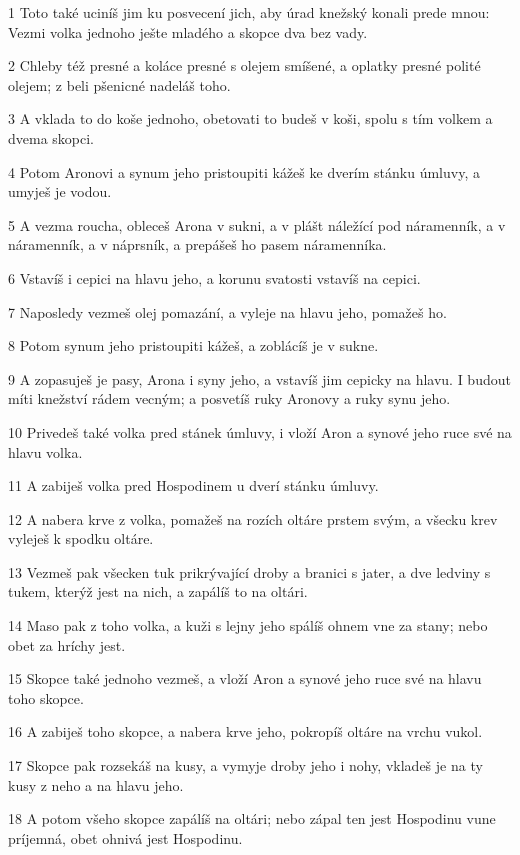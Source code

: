 \par 1 Toto také uciníš jim ku posvecení jich, aby úrad knežský konali prede mnou: Vezmi volka jednoho ješte mladého a skopce dva bez vady.
\par 2 Chleby též presné a koláce presné s olejem smíšené, a oplatky presné polité olejem; z beli pšenicné nadeláš toho.
\par 3 A vklada to do koše jednoho, obetovati to budeš v koši, spolu s tím volkem a dvema skopci.
\par 4 Potom Aronovi a synum jeho pristoupiti kážeš ke dverím stánku úmluvy, a umyješ je vodou.
\par 5 A vezma roucha, obleceš Arona v sukni, a v plášt náležící pod náramenník, a v náramenník, a v náprsník, a prepášeš ho pasem náramenníka.
\par 6 Vstavíš i cepici na hlavu jeho, a korunu svatosti vstavíš na cepici.
\par 7 Naposledy vezmeš olej pomazání, a vyleje na hlavu jeho, pomažeš ho.
\par 8 Potom synum jeho pristoupiti kážeš, a zoblácíš je v sukne.
\par 9 A zopasuješ je pasy, Arona i syny jeho, a vstavíš jim cepicky na hlavu. I budout míti knežství rádem vecným; a posvetíš ruky Aronovy a ruky synu jeho.
\par 10 Privedeš také volka pred stánek úmluvy, i vloží Aron a synové jeho ruce své na hlavu volka.
\par 11 A zabiješ volka pred Hospodinem u dverí stánku úmluvy.
\par 12 A nabera krve z volka, pomažeš na rozích oltáre prstem svým, a všecku krev vyleješ k spodku oltáre.
\par 13 Vezmeš pak všecken tuk prikrývající droby a branici s jater, a dve ledviny s tukem, kterýž jest na nich, a zapálíš to na oltári.
\par 14 Maso pak z toho volka, a kuži s lejny jeho spálíš ohnem vne za stany; nebo obet za hríchy jest.
\par 15 Skopce také jednoho vezmeš, a vloží Aron a synové jeho ruce své na hlavu toho skopce.
\par 16 A zabiješ toho skopce, a nabera krve jeho, pokropíš oltáre na vrchu vukol.
\par 17 Skopce pak rozsekáš na kusy, a vymyje droby jeho i nohy, vkladeš je na ty kusy z neho a na hlavu jeho.
\par 18 A potom všeho skopce zapálíš na oltári; nebo zápal ten jest Hospodinu vune príjemná, obet ohnivá jest Hospodinu.
